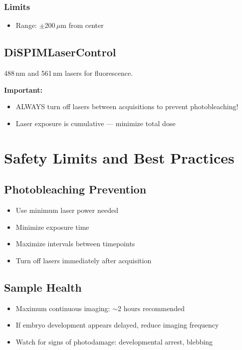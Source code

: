 \documentclass[11pt,letterpaper]{article}
\begin{document}
\subsubsection*{Limits}
\begin{itemize}
    \item Range: $\pm$200\,$\mu$m from center
\end{itemize}

\subsection{DiSPIMLaserControl}

488\,nm and 561\,nm lasers for fluorescence.

\textbf{Important:}
\begin{itemize}
    \item ALWAYS turn off lasers between acquisitions to prevent photobleaching!
    \item Laser exposure is cumulative --- minimize total dose
\end{itemize}

\section{Safety Limits and Best Practices}

\subsection{Photobleaching Prevention}
\begin{itemize}
    \item Use minimum laser power needed
    \item Minimize exposure time
    \item Maximize intervals between timepoints
    \item Turn off lasers immediately after acquisition
\end{itemize}

\subsection{Sample Health}
\begin{itemize}
    \item Maximum continuous imaging: $\sim$2 hours recommended
    \item If embryo development appears delayed, reduce imaging frequency
    \item Watch for signs of photodamage: developmental arrest, blebbing
\end{itemize}
\end{document}
